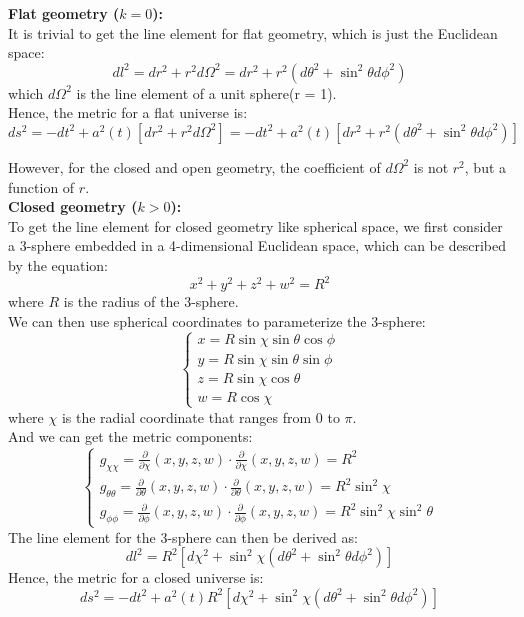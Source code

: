 \bigskip\noindent
\begin{theory}
    \textbf{Flat geometry ($k=0$):} \\
    It is trivial to get the line element for flat geometry, which is just the Euclidean space:
    \[
        dl^2 = dr^2 + r^2 d\Omega^2 = dr^2 + r^2 (d\theta^2 + \sin^2\theta d\phi^2)
    \]
    which $d\Omega^2$ is the line element of a unit sphere(r = 1). \\
    Hence, the metric for a flat universe is:
    \[
        ds^2 = -dt^2 + a^2(t) [dr^2 + r^2 d\Omega^2] = -dt^2 + a^2(t) \left[ dr^2 + r^2 (d\theta^2 + \sin^2\theta d\phi^2) \right]
    \]

    However, for the closed and open geometry, the coefficient of $d\Omega^2$ is not $r^2$, but a function of $r$. \\

    \textbf{Closed geometry ($k > 0$):} \\
    To get the line element for closed geometry like spherical space, we first consider a 3-sphere embedded in a 4-dimensional Euclidean space, which can be described by the equation:
    \[
        x^2 + y^2 + z^2 + w^2 = R^2
    \]
    where $R$ is the radius of the 3-sphere. \\
    We can then use spherical coordinates to parameterize the 3-sphere:
    \[
        \begin{cases}
            x = R \sin\chi \sin\theta \cos\phi \\
            y = R \sin\chi \sin\theta \sin\phi \\
            z = R \sin\chi \cos\theta \\
            w = R \cos\chi
        \end{cases}
    \]
    where $\chi$ is the radial coordinate that ranges from 0 to $\pi$. \\
    And we can get the metric components:
    \[
        \begin{cases}
            g_{\chi\chi} = \frac{\partial}{\partial \chi} (x, y, z, w) \cdot \frac{\partial}{\partial \chi} (x, y, z, w) = R^2 \\
            g_{\theta\theta} = \frac{\partial}{\partial \theta} (x, y, z, w) \cdot \frac{\partial}{\partial \theta} (x, y, z, w) = R^2 \sin^2\chi \\
            g_{\phi\phi} = \frac{\partial}{\partial \phi} (x, y, z, w) \cdot \frac{\partial}{\partial \phi} (x, y, z, w) = R^2 \sin^2\chi \sin^2\theta
        \end{cases}
    \]
    The line element for the 3-sphere can then be derived as:
    \[
        dl^2 = R^2 \left[ d\chi^2 + \sin^2\chi (d\theta^2 + \sin^2\theta d\phi^2) \right]
    \]
    Hence, the metric for a closed universe is:
    \[
        ds^2 = -dt^2 + a^2(t) R^2 \left[ d\chi^2 + \sin^2\chi (d\theta^2 + \sin^2\theta d\phi^2) \right]
    \]  
    \\
    

\end{theory}
